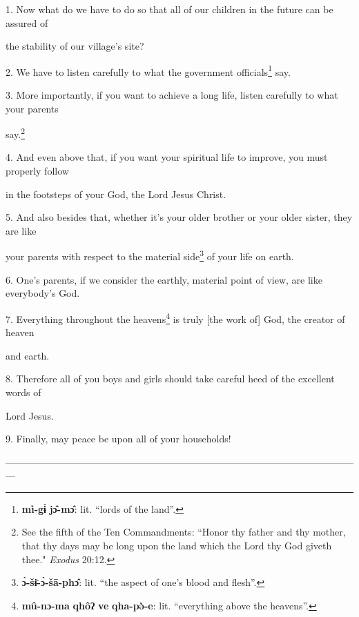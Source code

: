 \setcounter{footnote}{0}

1. Now what do we have to do so that all of our children in the future can be assured
of

the stability of our village's site?

2. We have to listen carefully to what the government officials\footnote{\textbf{mì-gɨ̀} \textbf{jɔ̂-mɔ̂}: lit. ``lords of the land''.} say.

3. More importantly, if you want to achieve a long life, listen carefully to what
your parents

say.\footnote{See the fifth of the Ten Commandments: ``Honor thy father and thy mother, that thy days may be long upon the land which the Lord thy God giveth thee." \textit{Exodus} 20:12.}

4. And even above that, if you want your spiritual life to improve, you must properly
follow

in the footsteps of your God, the Lord Jesus Christ.

5. And also besides that, whether it's your older brother or your older sister,
they are like

your parents with respect to the material side\footnote{\textbf{ɔ̀-šɨ̄-ɔ̀-šā-phɔ̂}: lit. ``the aspect of one's blood and flesh''.} of your life on earth.

6. One's parents, if we consider the earthly, material point of view, are like
everybody's God.

7. Everything throughout the heavens\footnote{\textbf{mû-nɔ-ma} \textbf{qhôʔ} \textbf{ve} \textbf{qha-pə̀-e}: lit. ``everything above the heavens''.} is truly [the work of] God, the creator
of heaven

and earth.

8. Therefore all of you boys and girls should take careful heed of the excellent
words of

Lord Jesus.

9. Finally, may peace be upon all of your households!

---------------------------------------------------------------------------------------------------------------

